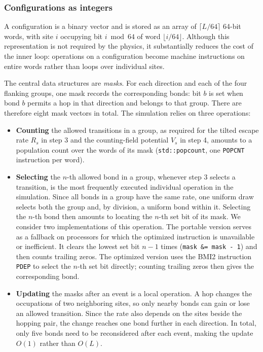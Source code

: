 \documentclass[11pt]{article}
\begin{document}
\subsubsection{Configurations as integers}
\label{sec:implementation-1}
A configuration is a binary vector and is stored as an array of $\lceil L/64 \rceil$ 64-bit words, with site $i$ occupying bit $i \bmod 64$ of word $\lfloor i/64 \rfloor$. Although this representation is not required by the physics, it substantially reduces the cost of the inner loop: operations on a configuration become machine instructions on entire words rather than loops over individual sites.

The central data structures are \emph{masks}. For each direction and each of the four flanking groups, one mask records the corresponding bonds: bit $b$ is set when bond $b$ permits a hop in that direction and belongs to that group. There are therefore eight mask vectors in total. The simulation relies on three operations:

\begin{itemize}
\item \textbf{Counting} the allowed transitions in a group, as required for the tilted escape rate $R_s$ in step 3 and the counting-field potential $V_s$ in step 4, amounts to a population count over the words of its mask (\texttt{std::popcount}, one \texttt{POPCNT} instruction per word).

\item \textbf{Selecting} the $n$-th allowed bond in a group, whenever step 3 selects a transition, is the most frequently executed individual operation in the simulation. Since all bonds in a group have the same rate, one uniform draw selects both the group and, by division, a uniform bond within it. Selecting the $n$-th bond then amounts to locating the $n$-th set bit of its mask. We consider two implementations of this operation. The portable version serves as a fallback on processors for which the optimized instruction is unavailable or inefficient. It clears the lowest set bit $n-1$ times (\texttt{mask \&= mask - 1}) and then counts trailing zeros. The optimized version uses the BMI2 instruction \texttt{PDEP} to select the $n$-th set bit directly; counting trailing zeros then gives the corresponding bond.

\item \textbf{Updating} the masks after an event is a local operation. A hop changes the occupations of two neighboring sites, so only nearby bonds can gain or lose an allowed transition. Since the rate also depends on the sites beside the hopping pair, the change reaches one bond further in each direction. In total, only five bonds need to be reconsidered after each event, making the update $O(1)$ rather than $O(L)$.
\end{itemize}
\end{document}
